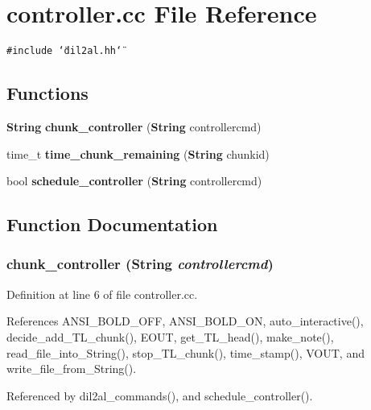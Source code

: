 \section{controller.cc File Reference}
\label{controller_8cc}
{\tt \#include \char`\"{}dil2al.hh\char`\"{}}\par
\subsection*{Functions}
\begin{CompactItemize}
\item 
{\bf String} {\bf chunk\_\-controller} ({\bf String} controllercmd)
\item 
time\_\-t {\bf time\_\-chunk\_\-remaining} ({\bf String} chunkid)
\item 
bool {\bf schedule\_\-controller} ({\bf String} controllercmd)
\end{CompactItemize}


\subsection{Function Documentation}
\subsubsection{ chunk\_\-controller ({\bf String} {\em controllercmd})}\label{controller_8cc_a0}




Definition at line 6 of file controller.cc.

References ANSI\_\-BOLD\_\-OFF, ANSI\_\-BOLD\_\-ON, auto\_\-interactive(), decide\_\-add\_\-TL\_\-chunk(), EOUT, get\_\-TL\_\-head(), make\_\-note(), read\_\-file\_\-into\_\-String(), stop\_\-TL\_\-chunk(), time\_\-stamp(), VOUT, and write\_\-file\_\-from\_\-String().

Referenced by dil2al\_\-commands(), and schedule\_\-controller().



